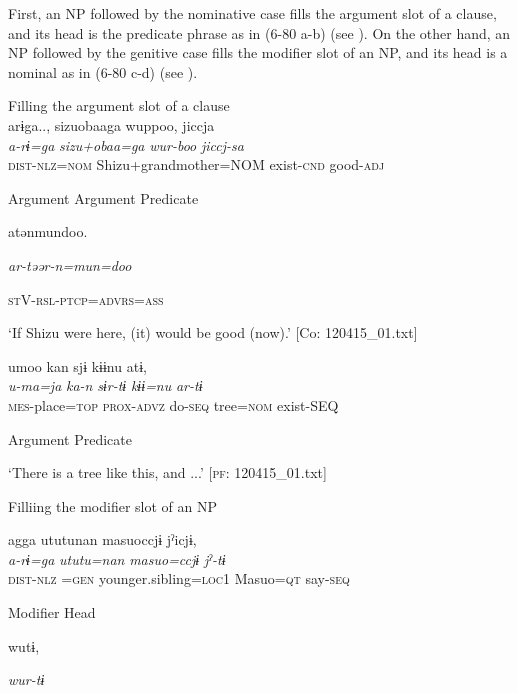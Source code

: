 First, an NP followed by the nominative case fills the argument slot of a clause, and its head is the predicate phrase as in (6-80 a-b) (see ). On the other hand, an NP followed by the genitive case fills the modifier slot of an NP, and its head is a nominal as in (6-80 c-d) (see ).

\ea\label{ex:6-80}
 Filling the argument slot of a clause\\

 \ea {\TM}  arɨga..,  sizuobaaga  wuppoo,  jiccja\\
\gll \textit{a-rɨ=ga}  \textit{sizu+obaa=ga}  \textit{wur-boo}  \textit{jiccj-sa}\\

      \textsc{dist}-\textsc{nlz}=\textsc{nom}  Shizu+grandmother=NOM  exist-\textsc{cnd}  good-\textsc{adj}

      Argument  Argument  Predicate  

      atənmundoo.

      \textit{ar-təər-n=mun=doo}

      \textsc{st}V-\textsc{rsl}-\textsc{ptcp}=\textsc{advrs}=\textsc{ass}

\glt ‘If Shizu were here, (it) would be good (now).’ [Co: 120415\_01.txt]
\z

 \ex {\TM}  umoo  kan  sjɨ  kɨɨnu  atɨ,\\
\gll \textit{u-ma=ja}  \textit{ka-n}  \textit{sɨr-tɨ}  \textit{kɨɨ=nu}  \textit{ar-tɨ}\\

      \textsc{mes}-place=\textsc{top}  \textsc{prox}-\textsc{advz}  do-\textsc{seq}  tree=\textsc{nom}  exist-SEQ

            Argument  Predicate

\glt ‘There is a tree like this, and ...’ [\textsc{pf}: 120415\_01.txt]
\z

  Filliing the modifier slot of an NP

 \ex {\TM}  agga  ututunan  masuoccjɨ  jˀicjɨ,\\
\gll \textit{a-rɨ=ga}  \textit{ututu=nan}  \textit{masuo=ccjɨ}  \textit{jˀ-tɨ}\\

      \textsc{dist}-\textsc{nlz} =\textsc{gen}  younger.sibling=\textsc{loc}1  Masuo=\textsc{qt}  say-\textsc{seq}

      Modifier  Head    

      wutɨ,

      \textit{wur-tɨ}

